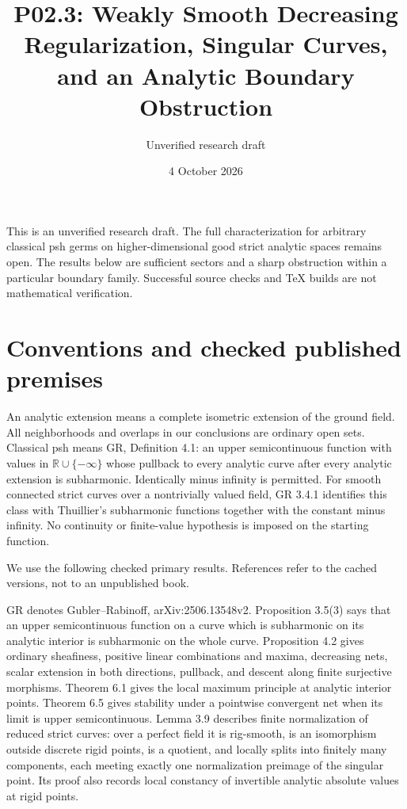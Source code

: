 \documentclass[11pt]{article}
\title{P02.3: Weakly Smooth Decreasing Regularization, Singular Curves, and an Analytic Boundary Obstruction}
\author{Unverified research draft}
\date{4 October 2026}
\begin{document}
\maketitle

This is an unverified research draft. The full characterization for arbitrary classical psh germs on higher-dimensional good strict analytic spaces remains open. The results below are sufficient sectors and a sharp obstruction within a particular boundary family. Successful source checks and TeX builds are not mathematical verification.

\section{Conventions and checked published premises}

An analytic extension means a complete isometric extension of the ground field. All neighborhoods and overlaps in our conclusions are ordinary open sets. Classical psh means GR, Definition 4.1: an upper semicontinuous function with values in \(\mathbb R\cup\{-\infty\}\) whose pullback to every analytic curve after every analytic extension is subharmonic. Identically minus infinity is permitted. For smooth connected strict curves over a nontrivially valued field, GR 3.4.1 identifies this class with Thuillier's subharmonic functions together with the constant minus infinity. No continuity or finite-value hypothesis is imposed on the starting function.

We use the following checked primary results. References refer to the cached versions, not to an unpublished book.

GR denotes Gubler--Rabinoff, arXiv:2506.13548v2. Proposition 3.5(3) says that an upper semicontinuous function on a curve which is subharmonic on its analytic interior is subharmonic on the whole curve. Proposition 4.2 gives ordinary sheafiness, positive linear combinations and maxima, decreasing nets, scalar extension in both directions, pullback, and descent along finite surjective morphisms. Theorem 6.1 gives the local maximum principle at analytic interior points. Theorem 6.5 gives stability under a pointwise convergent net when its limit is upper semicontinuous. Lemma 3.9 describes finite normalization of reduced strict curves: over a perfect field it is rig-smooth, is an isomorphism outside discrete rigid points, is a quotient, and locally splits into finitely many components, each meeting exactly one normalization preimage of the singular point. Its proof also records local constancy of invertible analytic absolute values at rigid points.
\end{document}
